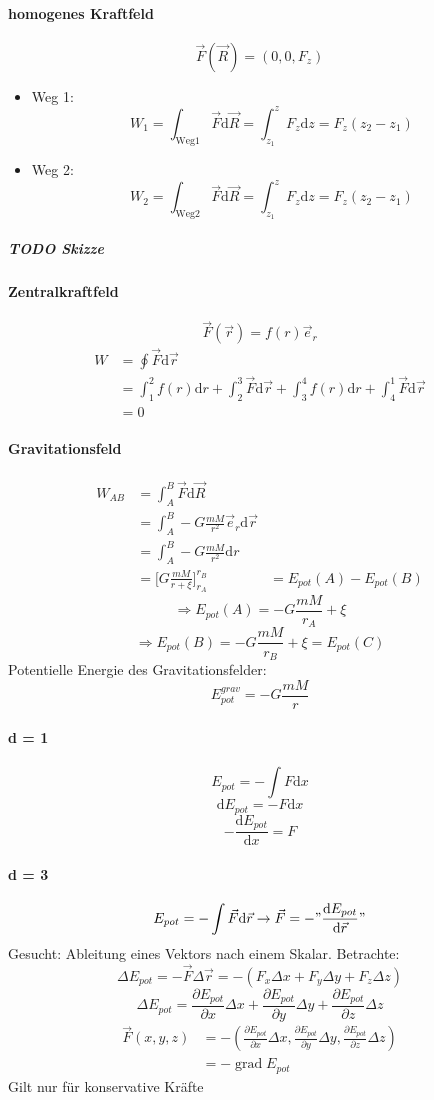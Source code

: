 \documentclass[a4paper]{scrartcl}
\DeclareMathOperator{\grad}{grad}
\renewcommand{\d}{\mathrm{d}}
\renewcommand{\v}[1]{\vec{#1}}
\begin{document}
\paragraph{homogenes Kraftfeld}
\label{sec-9-9-4-1}
\[\v F(\v R) = (0,0,F_z)\]
\begin{itemize}
\item Weg 1: \[W_1 = \int_{\text{Weg1}}\v F\d \v R = \int_{z_1}^z F_z\d z = F_z(z_2 - z_1)\]
\item Weg 2: \[W_2 = \int_{\text{Weg2}}\v F\d \v R = \int_{z_1}^z F_z\d z = F_z(z_2 - z_1)\]
\end{itemize}
\subparagraph{{\bfseries\sffamily TODO} Skizze}
\label{sec-9-9-4-1-1}
\paragraph{Zentralkraftfeld}
\label{sec-9-9-4-2}
\[\v F(\v r) = f(r)\v e_r\]
\begin{align}
W &= \oint\v F\d \v r \\
&= \int_1^2 f(r)\d r + \int_2^3 \v F\d \v r + \int_3^4 f(r)\d r + \int_4^1 \v F\d \v r \\
&= 0
\end{align}
\paragraph{Gravitationsfeld}
\label{sec-9-9-4-3}
\begin{align}
W_{AB} &= \int_A^B\v F\d \v R \\
&= \int_A^B -G\frac{mM}{r^2}\v e_r\d\v r \\
&= \int_A^B -G\frac{mM}{r^2}\d r \\
&= \Big[G\frac{mM}{r + \xi}\Big]_{r_A}^{r_B}
&= E_{pot}(A) - E_{pot}(B)
\end{align}
\[\Rightarrow E_{pot}(A) = -G\frac{mM}{r_A} + \xi\]
\[\Rightarrow E_{pot}(B) = -G\frac{mM}{r_B} + \xi = E_{pot}(C)\]
Potentielle Energie des Gravitationsfelder:
\[E_{pot}^{grav} = -G\frac{mM}{r}\]
\paragraph{d = 1}
\label{sec-9-9-4-4}
\[E_{pot} = -\int F\d x\]
\[\d E_{pot} = -F\d x\]
\[-\frac{\d E_{pot}}{\d x} = F\]
\paragraph{d = 3}
\label{sec-9-9-4-5}
\[E_{pot} = -\int \v F\d\v r \rightarrow \v F = - "\frac{\d E_{pot}}{\d \v r}"\]
Gesucht: Ableitung eines Vektors nach einem Skalar.
Betrachte:\[\Delta E_{pot} = -\v F\Delta \v r = -(F_x \Delta x + F_y \Delta y + F_z \Delta z)\]
\[\Delta E_{pot} = \frac{\partial E_{pot}}{\partial x} \Delta x + \frac{\partial E_{pot}}{\partial y} \Delta y + \frac{\partial E_{pot}}{\partial z} \Delta z\]
\begin{align}
\v F(x,y,z) &= - (\frac{\partial E_{pot}}{\partial x} \Delta x , \frac{\partial E_{pot}}{\partial y} \Delta y , \frac{\partial E_{pot}}{\partial z} \Delta z) \\
&= -\grad E_{pot}
\end{align}
Gilt nur für konservative Kräfte
\end{document}
